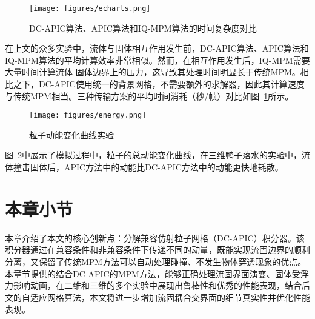 \begin{figure}[H]
    \centering
    \texttt{[image: figures/echarts.png]}
    \caption{DC-APIC算法、APIC算法和IQ-MPM算法的时间复杂度对比}
    \label{fig:echarts}
\end{figure}
在上文的众多实验中，流体与固体相互作用发生前，DC-APIC算法、APIC算法和IQ-MPM算法的平均计算效率非常相似。然而，在相互作用发生后，IQ-MPM需要大量时间计算流体-固体边界上的压力，这导致其处理时间明显长于传统MPM。相比之下，DC-APIC使用统一的背景网格，不需要额外的求解器，因此其计算速度与传统MPM相当。三种传输方案的平均时间消耗（秒/帧）对比如图~\ref{fig:echarts}所示。

\begin{figure}[H]
    \centering
    \texttt{[image: figures/energy.png]}
    \caption{粒子动能变化曲线实验}
    \label{fig:energy}
\end{figure}
图~\ref{fig:energy}中展示了模拟过程中，粒子的总动能变化曲线，在三维鸭子落水的实验中，流体撞击固体后，APIC方法中的动能比DC-APIC方法中的动能更快地耗散。


\section{本章小节}
本章介绍了本文的核心创新点：分解兼容仿射粒子网格（DC-APIC）积分器。该积分器通过在兼容条件和非兼容条件下传递不同的动量，既能实现流固边界的顺利分离，又保留了传统MPM方法可以自动处理碰撞、不发生物体穿透现象的优点。本章节提供的结合DC-APIC的MPM方法，能够正确处理流固界面演变、固体受浮力影响动画，在二维和三维的多个实验中展现出鲁棒性和优秀的性能表现，结合后文的自适应网格算法，本文将进一步增加流固耦合交界面的细节真实性并优化性能表现。
